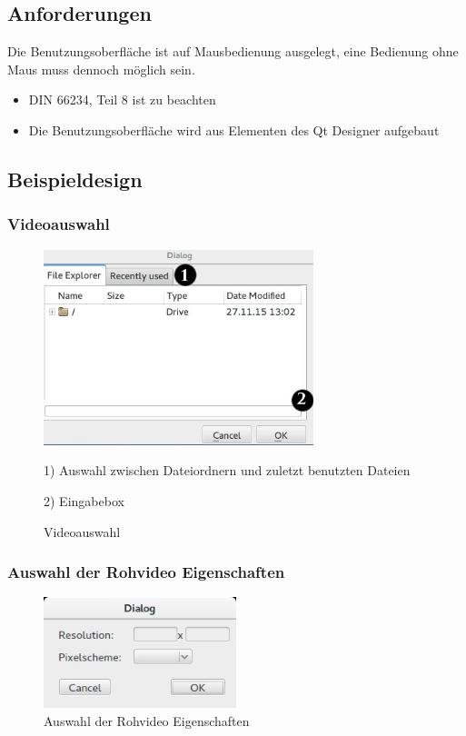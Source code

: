 \documentclass[parskip=full]{scrartcl}
\begin{document}
\subsection{Anforderungen}
Die Benutzungsoberfläche ist auf Mausbedienung ausgelegt, eine Bedienung ohne Maus muss dennoch möglich sein.
\begin{itemize}
\item DIN 66234, Teil 8 ist zu beachten
\item Die Benutzungsoberfläche wird aus Elementen des Qt Designer aufgebaut
\end{itemize}
\subsection{Beispieldesign}

\subsubsection{Videoauswahl}
\begin{figure}[htbp] 
\centering
\includegraphics[width=0.7\textwidth]{ToViET/Screenshots/Fileselector.jpg}
\caption{Videoauswahl}
\begin{flushleft}
\item 1) Auswahl zwischen Dateiordnern und zuletzt benutzten Dateien
\item 2) Eingabebox 

\end{flushleft}
\end{figure}
\subsubsection{Auswahl der Rohvideo Eigenschaften}
\begin{figure}[htbp] 
\centering
\includegraphics[width=0.5\textwidth]{ToViET/Screenshots/RawVidProperties.jpg}
\caption{Auswahl der Rohvideo Eigenschaften}

\end{figure}
\newpage
\end{document}
